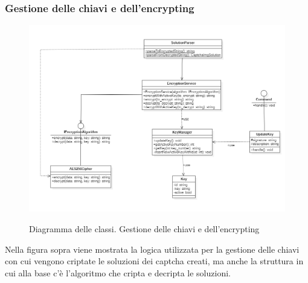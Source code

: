 \newpage

\subsubsection{Gestione delle chiavi e dell'encrypting}

\begin{figure}[H]
	\centering
	\includegraphics[scale = 0.55]{img/key_manager.png}\\
	\caption{Diagramma delle classi. Gestione delle chiavi e dell'encrypting}
\end{figure}

Nella figura sopra viene mostrata la logica utilizzata per la gestione delle chiavi con cui vengono criptate le soluzioni dei captcha creati, ma anche la struttura in cui alla base c'è l'algoritmo che cripta e decripta le soluzioni.

